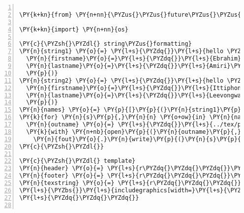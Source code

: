 \begin{Verbatim}[commandchars=\\\{\},numbers=left,numbersep=0.5em]
 
\PY{k+kn}{from} \PY{n+nn}{\PYZus{}\PYZus{}future\PYZus{}\PYZus{}} \PY{k+kn}{import} \PY{n}{print\PYZus{}function}

\PY{k+kn}{import} \PY{n+nn}{os}

\PY{c}{\PYZsh{}\PYZdl{} string\PYZus{}formatting}
\PY{n}{string1} \PY{o}{=} \PY{l+s}{\PYZdq{}}\PY{l+s}{hello \PYZob{}firstname\PYZcb{} \PYZob{}lastname\PYZcb{}}\PY{l+s}{\PYZdq{}}\PY{o}{.}\PY{n}{format}\PY{p}{(}
  \PY{n}{firstname}\PY{o}{=}\PY{l+s}{\PYZdq{}}\PY{l+s}{Ebrahim}\PY{l+s}{\PYZdq{}}\PY{p}{,}
  \PY{n}{lastname}\PY{o}{=}\PY{l+s}{\PYZdq{}}\PY{l+s}{Amiri}\PY{l+s}{\PYZdq{}}\PY{p}{,}
  \PY{p}{)}
\PY{n}{string2} \PY{o}{=} \PY{l+s}{\PYZdq{}}\PY{l+s}{hello \PYZob{}\PYZob{}\PYZob{}firstname\PYZcb{}\PYZcb{}\PYZcb{} \PYZob{}\PYZob{}\PYZob{}lastname\PYZcb{}\PYZcb{}\PYZcb{}}\PY{l+s}{\PYZdq{}}\PY{o}{.}\PY{n}{format}\PY{p}{(}
  \PY{n}{firstname}\PY{o}{=}\PY{l+s}{\PYZdq{}}\PY{l+s}{Ittiphong}\PY{l+s}{\PYZdq{}}\PY{p}{,}
  \PY{n}{lastname}\PY{o}{=}\PY{l+s}{\PYZdq{}}\PY{l+s}{Leevongwat}\PY{l+s}{\PYZdq{}}\PY{p}{,}
  \PY{p}{)}
\PY{n}{names} \PY{o}{=} \PY{p}{[}\PY{p}{(}\PY{n}{string1}\PY{p}{,}\PY{l+s}{\PYZdq{}}\PY{l+s}{amiri}\PY{l+s}{\PYZdq{}}\PY{p}{)}\PY{p}{,} \PY{p}{(}\PY{n}{string2}\PY{p}{,}\PY{l+s}{\PYZdq{}}\PY{l+s}{leev}\PY{l+s}{\PYZdq{}}\PY{p}{)}\PY{p}{]}
\PY{k}{for} \PY{n}{s}\PY{p}{,}\PY{n}{n} \PY{o+ow}{in} \PY{n}{names}\PY{p}{:}
  \PY{n}{outname} \PY{o}{=} \PY{l+s}{\PYZdq{}}\PY{l+s}{../tex/pieces/\PYZob{}\PYZcb{}.tex}\PY{l+s}{\PYZdq{}}\PY{o}{.}\PY{n}{format}\PY{p}{(}\PY{n}{n}\PY{p}{)}
  \PY{k}{with} \PY{n+nb}{open}\PY{p}{(}\PY{n}{outname}\PY{p}{,}\PY{l+s}{\PYZdq{}}\PY{l+s}{w}\PY{l+s}{\PYZdq{}}\PY{p}{)} \PY{k}{as} \PY{n}{fout}\PY{p}{:}
    \PY{n}{fout}\PY{o}{.}\PY{n}{write}\PY{p}{(}\PY{n}{s}\PY{p}{)}
\PY{c}{\PYZsh{}\PYZdl{}}

\PY{c}{\PYZsh{}\PYZdl{} template}
\PY{n}{header} \PY{o}{=} \PY{l+s}{r\PYZdq{}\PYZdq{}\PYZdq{}}\PY{l+s}{\PYZbs{}}\PY{l+s}{begin\PYZob{}multicols\PYZcb{}\PYZob{}[=[cols]=]\PYZcb{}}\PY{l+s}{\PYZdq{}\PYZdq{}\PYZdq{}}
\PY{n}{footer} \PY{o}{=} \PY{l+s}{r\PYZdq{}\PYZdq{}\PYZdq{}}\PY{l+s}{\PYZbs{}}\PY{l+s}{end\PYZob{}multicols\PYZcb{}}\PY{l+s}{\PYZdq{}\PYZdq{}\PYZdq{}}
\PY{n}{texstring} \PY{o}{=} \PY{l+s}{r\PYZdq{}\PYZdq{}\PYZdq{}}
\PY{l+s}{\PYZbs{}}\PY{l+s}{includegraphics[width=}\PY{l+s}{\PYZbs{}}\PY{l+s}{linewidth]\PYZob{}[=[name]=]\PYZcb{}}
\PY{l+s}{\PYZdq{}\PYZdq{}\PYZdq{}}


\end{Verbatim}
